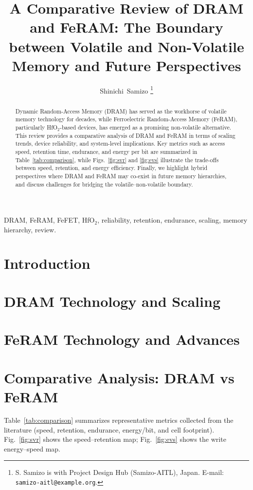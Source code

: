 \documentclass[journal]{IEEEtran}
\title{A Comparative Review of DRAM and FeRAM: The Boundary between Volatile and Non-Volatile Memory and Future Perspectives}
\author{Shinichi~Samizo%
\thanks{S. Samizo is with Project Design Hub (Samizo-AITL), Japan. E-mail: \texttt{samizo-aitl@example.org}.}
}
\begin{document}
\maketitle

\begin{abstract}
Dynamic Random-Access Memory (DRAM) has served as the workhorse of volatile memory technology for decades, while Ferroelectric Random-Access Memory (FeRAM), particularly HfO$_2$-based devices, has emerged as a promising non-volatile alternative. This review provides a comparative analysis of DRAM and FeRAM in terms of scaling trends, device reliability, and system-level implications. Key metrics such as access speed, retention time, endurance, and energy per bit are summarized in Table~\ref{tab:comparison}, while Figs.~\ref{fig:svr} and \ref{fig:evs} illustrate the trade-offs between speed, retention, and energy efficiency. Finally, we highlight hybrid perspectives where DRAM and FeRAM may co-exist in future memory hierarchies, and discuss challenges for bridging the volatile--non-volatile boundary.
\end{abstract}

\begin{IEEEkeywords}
DRAM, FeRAM, FeFET, HfO$_2$, reliability, retention, endurance, scaling, memory hierarchy, review.
\end{IEEEkeywords}

\section{Introduction}


\section{DRAM Technology and Scaling}


\section{FeRAM Technology and Advances}


\section{Comparative Analysis: DRAM vs FeRAM}
\label{sec:comparison}
Table~\ref{tab:comparison} summarizes representative metrics collected from the literature (speed, retention, endurance, energy/bit, and cell footprint). Fig.~\ref{fig:svr} shows the speed--retention map; Fig.~\ref{fig:evs} shows the write energy--speed map.
\end{document}
